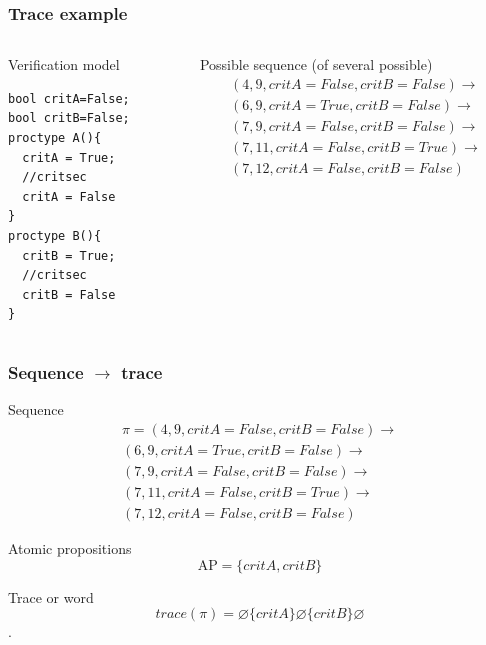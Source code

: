 \documentclass{beamer}
\begin{document}
\begin{frame}[fragile]
  \frametitle{Trace example}
  \begin{columns}
    \begin{column}{.4\textwidth}
      \begin{block}{Verification model}
        \begin{lstlisting}[frame=single]
bool critA=False;
bool critB=False;
proctype A(){
  critA = True;
  //critsec
  critA = False
}
proctype B(){
  critB = True;
  //critsec
  critB = False
}
\end{lstlisting}
      \end{block}
    \end{column}

    \begin{column}{.6\textwidth}
      \begin{block}{Possible sequence (of several possible)}
        \begin{equation*}
  \label{eq:path}
  \begin{split}
(4,9,critA=False,critB=False) \rightarrow \\
(6, 9, critA=True,critB=False) \rightarrow \\
(7, 9, critA=False,critB=False) \rightarrow \\
(7,11,critA=False,critB=True) \rightarrow \\
(7,12,critA=False,critB=False)
  \end{split}
\end{equation*}
      \end{block}
    \end{column}
  \end{columns}
\end{frame}

\begin{frame}
  \frametitle{Sequence $\rightarrow$ trace}
  \begin{block}{Sequence}
        \begin{equation*}
  \label{eq:path}
  \begin{split}
\pi=(4,9,critA=False,critB=False) \rightarrow \\
(6, 9, critA=True,critB=False) \rightarrow \\
(7, 9, critA=False,critB=False) \rightarrow \\
(7,11,critA=False,critB=True) \rightarrow \\
(7,12,critA=False,critB=False)
  \end{split}
\end{equation*}    
  \end{block}

  \begin{block}{Atomic propositions}
    \[
\text{AP}=\{critA, critB\}
\]
  \end{block}
  \begin{block}{Trace or word}
\[
trace(\pi) = \varnothing \{critA\} \varnothing \{critB\} \varnothing
\].
  \end{block}
\end{frame}
\end{document}
